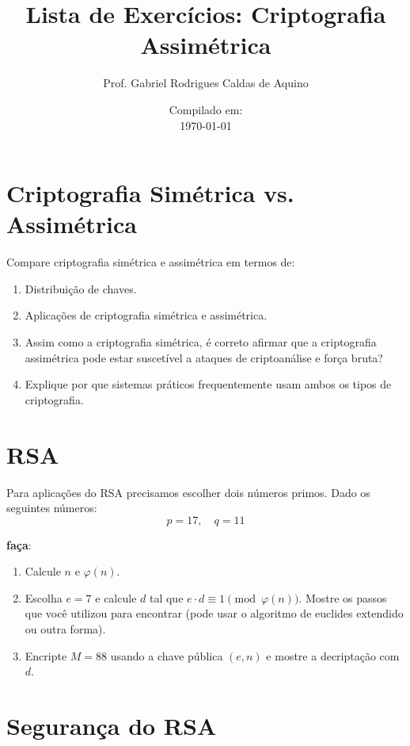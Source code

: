 \title{Lista de Exercícios: Criptografia Assimétrica}
\author{Prof. Gabriel Rodrigues Caldas de Aquino}
\date{Compilado em: \\ \today}



\maketitle

\section{Criptografia Simétrica vs. Assimétrica}
Compare criptografia simétrica e assimétrica em termos de:

\begin{enumerate}
    \item Distribuição de chaves.
    \item Aplicações de criptografia simétrica e assimétrica.
    \item Assim como a criptografia simétrica, é correto afirmar que a criptografia assimétrica pode estar suscetível a ataques de criptoanálise e força bruta?
    \item Explique por que sistemas práticos frequentemente usam ambos os tipos de criptografia.
\end{enumerate}



\section{RSA}
Para aplicações do RSA precisamos escolher dois números primos. Dado os seguintes números:
\[
    p = 17, \quad q = 11
\]

\textbf{faça}:
\begin{enumerate}
    \item Calcule \( n \) e \( \varphi(n) \).
    \item Escolha \( e = 7 \) e calcule \( d \) tal que \( e \cdot d \equiv 1 \pmod{\varphi(n)} \). Mostre os passos que você utilizou para encontrar (pode usar o algoritmo de euclides extendido ou outra forma).
    \item Encripte \( M = 88 \) usando a chave pública \((e, n)\) e mostre a decriptação com \( d \).
\end{enumerate}

\section{Segurança do RSA}

